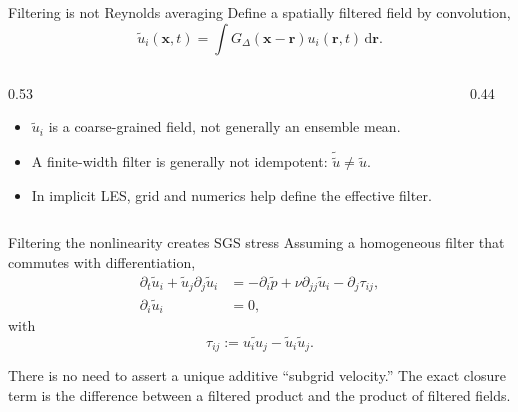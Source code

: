 \documentclass[aspectratio=169,11pt]{beamer}
\newcommand{\xvec}{\bm{x}}
\begin{document}
\begin{frame}{Filtering is not Reynolds averaging}
Define a spatially filtered field by convolution,
\[
  \widetilde{u}_i(\xvec,t)
  =\int G_\Delta(\xvec-\bm r)u_i(\bm r,t)\,\mathrm d\bm r.
\]

\begin{columns}[T,onlytextwidth]
\begin{column}{0.53\textwidth}
\begin{itemize}\itemsep4pt
  \item $\widetilde u_i$ is a coarse-grained field, not generally an ensemble mean.
  \item A finite-width filter is generally not idempotent: $\widetilde{\widetilde{u}}\ne\widetilde{u}$.
  \item In implicit LES, grid and numerics help define the effective filter.
\end{itemize}
\end{column}
\begin{column}{0.44\textwidth}
\centering
{}
\end{column}
\end{columns}
\end{frame}

\begin{frame}{Filtering the nonlinearity creates SGS stress}
Assuming a homogeneous filter that commutes with differentiation,
\begin{align*}
  \partial_t\widetilde u_i+\widetilde u_j\partial_j\widetilde u_i
  &= -\partial_i\widetilde p+\nu\partial_{jj}\widetilde u_i
     -\partial_j\tau_{ij},\\
  \partial_i\widetilde u_i&=0,
\end{align*}
with
\[
  \boxed{\tau_{ij}:=\widetilde{u_iu_j}-\widetilde u_i\widetilde u_j.}
\]

\begin{punchbox}
There is no need to assert a unique additive ``subgrid velocity.'' The exact closure term is the difference between a filtered product and the product of filtered fields.
\end{punchbox}
\end{frame}
\end{document}
